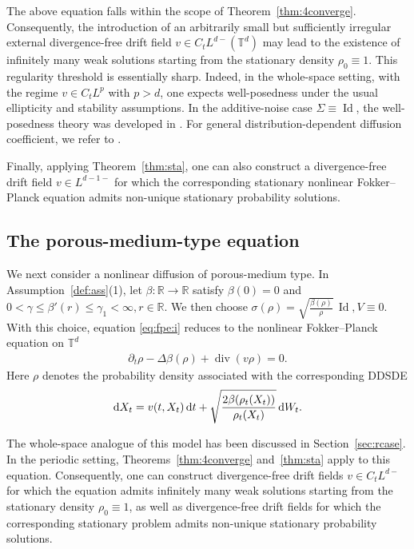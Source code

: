 \documentclass[UTF-8,reqno]{amsart}
\numberwithin{equation}{section}
\theoremstyle{definition}
\def\dif{{\mathord{{\rm d}}}}
\def\leq{\leqslant}
\def\dif{{\mathord{{\rm d}}}}
\def\leq{\leqslant}
\begin{document}
The above equation falls within the scope of
Theorem~\ref{thm:4converge}. Consequently, the introduction of an arbitrarily
small but sufficiently irregular external divergence-free drift field
$v\in C_tL^{d-}(\mathbb{T}^d)$ may lead to the existence of infinitely many
weak solutions starting from the stationary density $\rho_0\equiv 1$.
This regularity threshold is essentially sharp. Indeed, in the whole-space setting, with the regime
$v\in C_tL^p$ with $p>d$, one expects well-posedness under the usual
ellipticity and stability assumptions. In the additive-noise case
$\Sigma\equiv \operatorname{Id}$, the well-posedness theory   was developed in \cite[Theorem~4.3]{RZ21}. For general
distribution-dependent diffusion coefficient, we refer to  \cite[Theorem~4.1]{Zha25}.

Finally, applying Theorem~\ref{thm:sta}, one can also construct a divergence-free drift field
$
v\in L^{d-1-} 
$
for which the corresponding stationary nonlinear Fokker--Planck equation
admits non-unique stationary probability solutions.
 
\subsection{The porous-medium-type equation}

We next consider a nonlinear diffusion of porous-medium type. In   Assumption~\ref{def:ass}\textnormal{(1)}, let
$\beta:\mathbb{R}\to\mathbb{R}$ satisfy $\beta(0)=0$ and
$
0<\gamma\leq \beta'(r)\leq \gamma_1<\infty,
r\in\mathbb{R}.
$ We then choose
$
\sigma(\rho)
=
\sqrt{\frac{\beta(\rho)}{\rho}}\,\operatorname{Id},
V\equiv 0 .$
With this choice, equation \eqref{eq:fpe:i} reduces to the nonlinear
Fokker--Planck equation on $\mathbb{T}^d$
\begin{align*}
\partial_t\rho
-
\Delta\beta(\rho)
+
\operatorname{div}(v\rho)
=
0 .
\end{align*}
Here $\rho$ denotes the probability density associated with the corresponding
DDSDE
\begin{align*}
\dif X_t
=
v(t,X_t)\,\dif t
+
\sqrt{\frac{2\beta(\rho_t(X_t))}{\rho_t(X_t)}}\,\dif W_t .
\end{align*} 

The whole-space analogue of this model has been discussed in
Section~\ref{sec:rcase}. In the periodic setting, Theorems~\ref{thm:4converge}
and~\ref{thm:sta} apply to this equation. Consequently, one can construct
divergence-free drift fields $v\in C_tL^{d-}$ for which the equation admits infinitely many
weak solutions starting from the stationary density $\rho_0\equiv 1$, as well
as divergence-free drift fields for which the corresponding stationary problem
admits non-unique stationary probability solutions.
\end{document}
